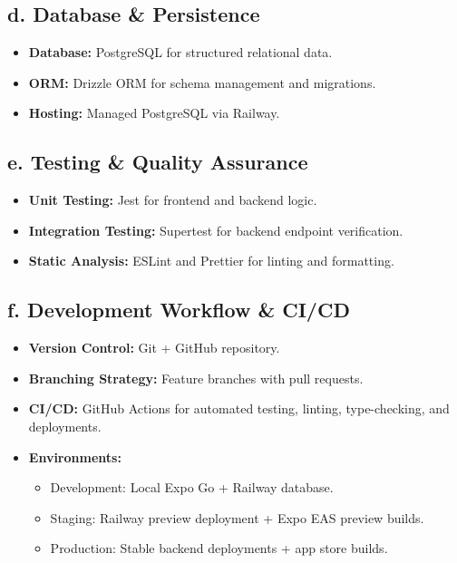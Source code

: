 \documentclass{article}
\begin{document}
\subsection*{d. Database \& Persistence}
\begin{itemize}
    \item \textbf{Database:} PostgreSQL for structured relational data.
    \item \textbf{ORM:} Drizzle ORM for schema management and migrations.
    \item \textbf{Hosting:} Managed PostgreSQL via Railway.
\end{itemize}

\subsection*{e. Testing \& Quality Assurance}
\begin{itemize}
    \item \textbf{Unit Testing:} Jest for frontend and backend logic.
    \item \textbf{Integration Testing:} Supertest for backend endpoint verification.
    \item \textbf{Static Analysis:} ESLint and Prettier for linting and formatting.
\end{itemize}

\subsection*{f. Development Workflow \& CI/CD}
\begin{itemize}
    \item \textbf{Version Control:} Git + GitHub repository.
    \item \textbf{Branching Strategy:} Feature branches with pull requests.
    \item \textbf{CI/CD:} GitHub Actions for automated testing, linting, type-checking, and deployments.
    \item \textbf{Environments:}
    \begin{itemize}
        \item Development: Local Expo Go + Railway database.
        \item Staging: Railway preview deployment + Expo EAS preview builds.
        \item Production: Stable backend deployments + app store builds.
    \end{itemize}
\end{itemize}
\end{document}
